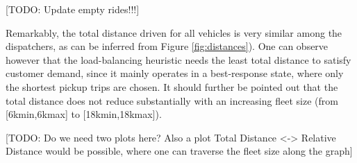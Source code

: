
[TODO: Update empty rides!!!]


Remarkably, the total distance driven for all vehicles is very similar among the dispatchers, as can be inferred from Figure \ref{fig:distances}). One can observe however that the load-balancing heuristic needs the least total distance to satisfy customer demand, since it mainly operates in a best-response state, where only the shortest pickup trips are chosen. It should further be pointed out that the total distance does not reduce substantially with an increasing fleet size (from [6kmin,6kmax] to [18kmin,18kmax]).  


[TODO: Do we need two plots here? Also a plot Total Distance <-> Relative Distance
would be possible, where one can traverse the fleet size along the graph]



